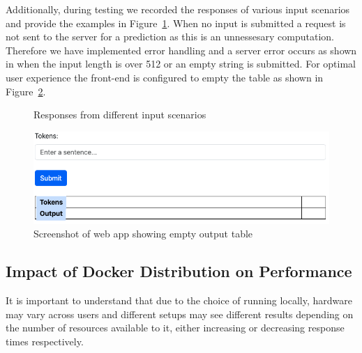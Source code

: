 \documentclass{surreydissertation}
\begin{document}
Additionally, during testing we recorded the responses of various input scenarios and provide the examples in Figure~\ref{fig:responses}. When no input is submitted a request is not sent to the server for a prediction as this is an unnessesary computation. Therefore we have implemented error handling and a server error occurs as shown in  when the input length is over 512 or an empty string is submitted. For optimal user experience the front-end is configured to empty the table as shown in Figure~\ref{fig:reset}.

\begin{figure}
    \centering
    \caption{Responses from different input scenarios}
    \label{fig:responses}
\end{figure}


\begin{figure}
    \centering
    \includegraphics[width=0.6\linewidth]{Figures/emptyfrontend.png}
    \caption{Screenshot of web app showing empty output table}
    \label{fig:reset}
 \end{figure}

\subsection{Impact of Docker Distribution on Performance}
It is important to understand that due to the choice of running locally, hardware may vary across users and different setups may see different results depending on the number of resources available to it, either increasing or decreasing response times respectively. 
\end{document}
